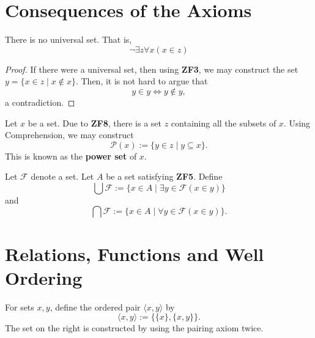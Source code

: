 \section{Consequences of the Axioms}

\begin{theorem}
    There is no universal set. That is, 
    \begin{equation*}
        \neg\exists z\forall x(x\in z)
    \end{equation*}
\end{theorem}
\begin{proof}
If there were a universal set, then using \textbf{ZF3}, we may construct the set $y = \{x\in z\mid x\notin x\}$. Then, it is not hard to argue that 
\begin{equation*}
    y\in y\iff y\notin y,
\end{equation*}
a contradiction.
\end{proof}

\begin{definition}
    Let $x$ be a set. Due to \textbf{ZF8}, there is a set $z$ containing all the subsets of $x$. Using Comprehension, we may construct
    \begin{equation*}
        \mathscr P(x) := \{y\in z\mid y\subseteq x\}.
    \end{equation*}
    This is known as the \textbf{power set} of $x$.
\end{definition}

\begin{definition}
    Let $\mathscr F$ denote a set. Let $A$ be a set satisfying \textbf{ZF5}. Define 
    \begin{equation*}
        \bigcup\mathscr F := \{x\in A\mid\exists y\in\mathscr F(x\in y)\}
    \end{equation*}
    and 
    \begin{equation*}
        \bigcap\mathscr F := \{x\in A\mid\forall y\in\mathscr F(x\in y)\}.
    \end{equation*}
\end{definition}

\section{Relations, Functions and Well Ordering}

\begin{definition}
    For sets $x,y$, define the ordered pair $\langle x,y\rangle$ by 
    \begin{equation*}
        \langle x,y\rangle := \{\{x\}, \{x,y\}\}.
    \end{equation*}
    The set on the right is constructed by using the pairing axiom twice.
\end{definition}

